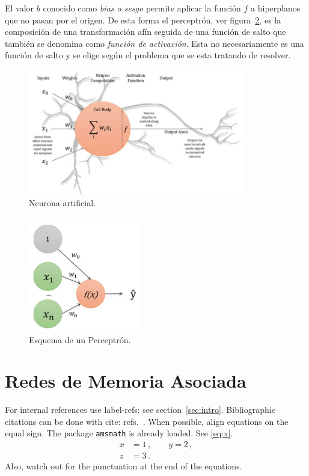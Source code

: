 \documentclass[letterpaper,12pt]{article}
\begin{document}
El valor $b$ conocido como \emph{bias o sesgo} permite aplicar la función $f$ a hiperplanos que no pasan por el origen. De esta forma el perceptrón, ver figura~\ref{perceptron}, es la composición de una transformación afín seguida de una función de salto que también se denomina como \emph{función de activación}. Esta no necesariamente es una función de salto y se elige según el problema que se esta tratando de resolver. \\

\begin{figure}
\begin{center}
\includegraphics[height=55mm]{neuron.PNG}
\caption{\small{Neurona artificial. }}
\label{neuron}
\end{center}
\end{figure}
\begin{figure}
\begin{center}
\includegraphics[height=50mm]{perceptron.PNG}
\caption{\small{Esquema de un Perceptrón. }}
\label{perceptron}
\end{center}
\end{figure}

\section{Redes de Memoria Asociada}
\label{sec:hop}

For internal references use label-refs: see section~\ref{sec:intro}.
Bibliographic citations can be done with cite: refs.~\cite{a,b0,c}.
When possible, align equations on the equal sign. The package
\texttt{amsmath} is already loaded. See \eqref{eq:x}.
\begin{equation}
\label{eq:x}
\begin{split}
x &= 1 \,,
\qquad
y = 2 \,,
\\
z &= 3 \,.
\end{split}
\end{equation}
Also, watch out for the punctuation at the end of the equations.
\end{document}

